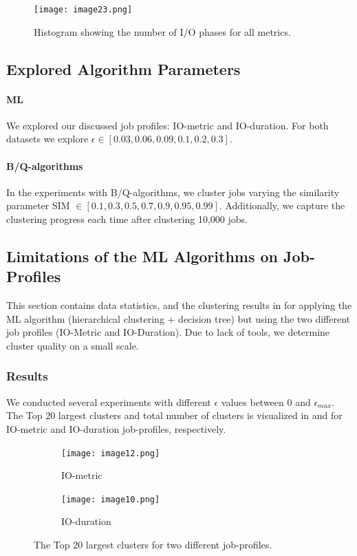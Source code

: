 \documentclass{jhps}
\begin{document}


\begin{figure}
  \centering
  \texttt{[image: image23.png]}
  \caption{Histogram showing the number of I/O phases for all metrics.}
  \label{fig:phases_stats}
\end{figure}


\subsection{Explored Algorithm Parameters}
\paragraph{ML}
We explored our discussed job profiles: IO-metric and IO-duration.
For both datasets we explore $\epsilon \in [0.03, 0.06, 0.09, 0.1, 0.2, 0.3]$.

\paragraph{B/Q-algorithms}
In the experiments with B/Q-algorithms, we cluster jobs varying the similarity parameter SIM $\in [0.1, 0.3, 0.5, 0.7, 0.9, 0.95, 0.99]$.
Additionally, we capture the clustering progress each time after clustering 10,000 jobs.


\subsection{Limitations of the ML Algorithms on Job-Profiles}
This section contains data statistics, and the clustering results in  for applying the ML algorithm (hierarchical clustering + decision tree) but using the two different job profiles (IO-Metric and IO-Duration).
Due to lack of tools, we determine cluster quality on a small scale.


\subsubsection{Results}
We conducted several experiments with different $\epsilon$ values between 0 and $\epsilon_{max}$.
The Top 20 largest clusters and total number of clusters is visualized in  and  for IO-metric and IO-duration job-profiles, respectively.

\begin{figure}
 \begin{subfigure}[t]{0.45\textwidth}
	\texttt{[image: image12.png]}
	\caption{IO-metric}
	\label{fig:datasets_clustering_results:io_metric}
 \end{subfigure}
 \hfill
	\begin{subfigure}[t]{0.45\textwidth}
	\texttt{[image: image10.png]}
	\caption{IO-duration}
	\label{fig:datasets_clustering_results:io_duration}
 \end{subfigure}

 \caption{The Top 20 largest clusters for two different job-profiles.}
 \label{fig:datasets_clustering_results}
\end{figure}
\end{document}
